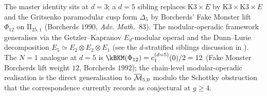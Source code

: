 \begin{remark}
\label{rem:universality-across-d-master}
The master identity sits at $d = 3$; a $d = 5$ sibling replaces
$\mathrm{K3} \times E$ by $\mathrm{K3} \times \mathrm{K3} \times E$
and the Gritsenko paramodular cusp form $\Delta_5$ by Borcherds'
Fake Monster lift $\Phi_{12}$ on $\mathrm{II}_{25, 1}$ (Borcherds
$1990$, \emph{Adv. Math.}~$83$). The modular-operadic framework
generalises via the Getzler--Kapranov $E_d$-modular operad and the
Dunn--Lurie decomposition $E_5 \simeq E_2 \otimes E_2 \otimes E_1$
(see the $d$-stratified siblings discussion in
\cite{VolI}). The $N = 1$ analogue
at $d = 5$ is $\kBKM(\Phi_{12}) = c_1^{(d = 5)}(0)/2 = 12$ (Fake
Monster Borcherds lift weight $12$, Borcherds $1992$); the
chain-level modular-operadic realisation is the direct generalisation
to $\overline{\mathcal{M}}_{5, 0}$ modulo the Schottky obstruction that the correspondence
currently records as conjectural at $g \geq 4$.
\end{remark}
